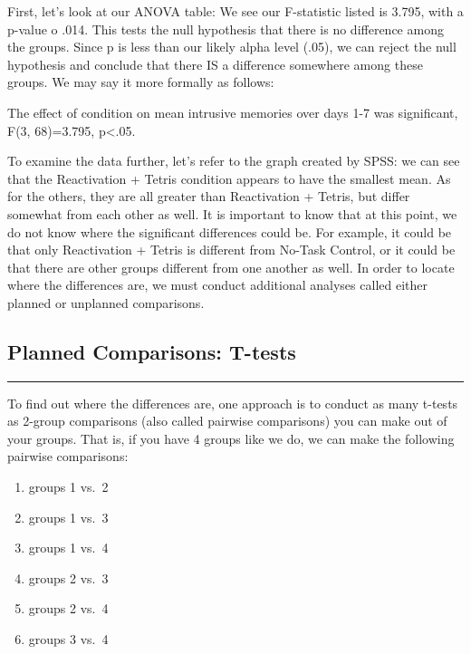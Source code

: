 \documentclass[
]{book}
\providecommand{\tightlist}{%
  \setlength{\itemsep}{0pt}\setlength{\parskip}{0pt}}
\begin{document}
First, let's look at our ANOVA table: We see our F-statistic listed is 3.795, with a p-value o .014. This tests the null hypothesis that there is no difference among the groups. Since p is less than our likely alpha level (.05), we can reject the null hypothesis and conclude that there IS a difference somewhere among these groups. We may say it more formally as follows:

The effect of condition on mean intrusive memories over days 1-7 was significant, F(3, 68)=3.795, p\textless.05.

To examine the data further, let's refer to the graph created by SPSS: we can see that the Reactivation + Tetris condition appears to have the smallest mean. As for the others, they are all greater than Reactivation + Tetris, but differ somewhat from each other as well. It is important to know that at this point, we do not know where the significant differences could be. For example, it could be that only Reactivation + Tetris is different from No-Task Control, or it could be that there are other groups different from one another as well. In order to locate where the differences are, we must conduct additional analyses called either planned or unplanned comparisons.

\hypertarget{planned-comparisons-t-tests}{%
\subsection{Planned Comparisons: T-tests}\label{planned-comparisons-t-tests}}

\begin{center}\rule{0.5\linewidth}{0.5pt}\end{center}

To find out where the differences are, one approach is to conduct as many t-tests as 2-group comparisons (also called pairwise comparisons) you can make out of your groups. That is, if you have 4 groups like we do, we can make the following pairwise comparisons:

\begin{enumerate}
\def\labelenumi{\arabic{enumi}.}
\tightlist
\item
  groups 1 vs.~2
\item
  groups 1 vs.~3
\item
  groups 1 vs.~4
\item
  groups 2 vs.~3
\item
  groups 2 vs.~4
\item
  groups 3 vs.~4
\end{enumerate}
\end{document}
